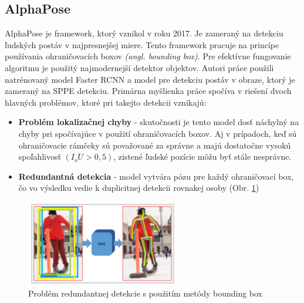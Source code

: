 \documentclass[slovak,master,dept460,male,cpp,cpdeclaration]{diploma}
\begin{document}
\subsection{AlphaPose}
AlphaPose\cite{fang2017rmpe} je framework, ktorý vznikol v roku 2017. Je zameraný na detekciu ľudských postáv v najpresnejšej miere. Tento framework pracuje na princípe používania ohraničovacích boxov \textit{(angl. bounding box)}. Pre efektívne fungovanie algoritmu je použitý najmodernejší detektor objektov. Autori práce použili natrénovaný model Faster RCNN\cite{ren2015faster} a model pre detekciu postáv v obraze\cite{newell2016stacked}, ktorý je zameraný na SPPE detekciu. Primárna myšlienka práce spočíva v riešení dvoch hlavných problémov, ktoré pri takejto detekcii vznikajú:
\begin{itemize}
\item \textbf{Problém lokalizačnej chyby} - skutočnosti je tento model dosť náchylný na chyby pri spočívajúce v použití ohraničovacích boxov. Aj v prípadoch, keď sú ohraničovacie rámčeky
sú považované za správne a majú dostatočne vysokú spoľahlivosť \textit{$(I_oU > 0,5)$}, zistené ľudské pozície môžu byť stále nesprávne. 
\item \textbf{Redundantná detekcia} - model vytvára pózu pre každý ohraničovací box, čo vo výsledku vedie k duplicitnej detekcii rovnakej osoby (Obr. \ref{fig:alphaPoseRedundant})
\end{itemize}

\begin{figure}[H]
	\centering
	\includegraphics[width=0.6\textwidth]{Figures/alphaPoseRedundant.png}
	\caption{Problém redundantnej detekcie s použitím metódy bounding box\cite{fang2017rmpe}}
	\label{fig:alphaPoseRedundant}
\end{figure}
\end{document}
